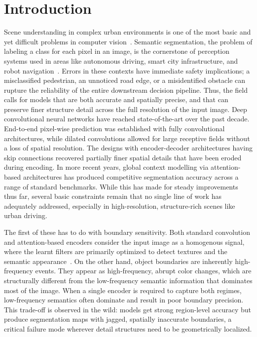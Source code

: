 \documentclass[conference]{IEEEtran}
\begin{document}
 
\section{Introduction}\label{sec:intro}

Scene understanding in complex urban environments is one of the most basic and yet difficult problems
in computer vision~\cite{aarthi2017scene}. Semantic segmentation, the problem of labeling a class for each pixel in an image,
is the cornerstone of perception systems used in areas like autonomous driving, smart city infrastructure,
and robot navigation~\cite{hurtado2022semantic}. Errors in these contexts have immediate safety implications; a misclassified
pedestrian, an unnoticed road edge, or a misidentified obstacle can rupture the reliability of the entire
downstream decision pipeline. Thus, the field calls for models that are both accurate and spatially precise,
and that can preserve finer structure detail across the full resolution of the input image. Deep convolutional
neural networks have reached state-of-the-art over the past decade. End-to-end pixel-wise prediction was
established with fully convolutional architectures, while dilated convolutions allowed for large receptive
fields without a loss of spatial resolution. The designs with encoder-decoder architectures having skip
connections recovered partially finer spatial details that have been eroded during encoding. In more recent
years, global context modelling via attention-based architectures has produced competitive segmentation
accuracy across a range of standard benchmarks. While this has made for steady improvements thus far,
several basic constraints remain that no single line of work has adequately addressed, especially in high-resolution, structure-rich scenes like urban driving.

The first of these has to do with boundary sensitivity. Both standard convolution and attention-based
encoders consider the input image as a homogenous signal, where the learnt filters are primarily optimized
to detect textures and the semantic appearance~\cite{scabini2025survey}. On the other hand, object boundaries are inherently
high-frequency events. They appear as high-frequency, abrupt color changes, which are structurally
different from the low-frequency semantic information that dominates most of the image. When a single
encoder is required to capture both regimes, low-frequency semantics often dominate and result in poor
boundary precision. This trade-off is observed in the wild: models get strong region-level accuracy but
produce segmentation maps with jagged, spatially inaccurate boundaries, a critical failure mode wherever
detail structures need to be geometrically localized.
\end{document}
